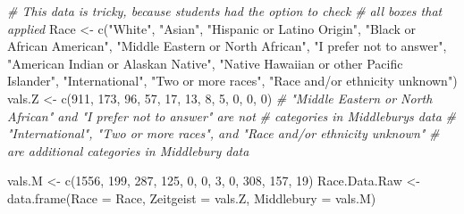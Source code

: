 \documentclass[
]{article}
\newenvironment{Shaded}{\begin{snugshade}}{\end{snugshade}}
\newcommand{\AttributeTok}[1]{\textcolor[rgb]{0.77,0.63,0.00}{#1}}
\newcommand{\CommentTok}[1]{\textcolor[rgb]{0.56,0.35,0.01}{\textit{#1}}}
\newcommand{\DecValTok}[1]{\textcolor[rgb]{0.00,0.00,0.81}{#1}}
\newcommand{\FunctionTok}[1]{\textcolor[rgb]{0.00,0.00,0.00}{#1}}
\newcommand{\NormalTok}[1]{#1}
\newcommand{\OtherTok}[1]{\textcolor[rgb]{0.56,0.35,0.01}{#1}}
\newcommand{\StringTok}[1]{\textcolor[rgb]{0.31,0.60,0.02}{#1}}
\begin{document}
\begin{Shaded}
\begin{Highlighting}[]
\CommentTok{\# This data is tricky, because students had the option to check}
\CommentTok{\# all boxes that applied}
\NormalTok{Race }\OtherTok{\textless{}{-}} \FunctionTok{c}\NormalTok{(}\StringTok{"White"}\NormalTok{, }\StringTok{"Asian"}\NormalTok{, }\StringTok{"Hispanic or Latino Origin"}\NormalTok{, }
          \StringTok{"Black or African American"}\NormalTok{, }\StringTok{"Middle Eastern or North African"}\NormalTok{, }
          \StringTok{"I prefer not to answer"}\NormalTok{, }\StringTok{"American Indian or Alaskan Native"}\NormalTok{,}
          \StringTok{"Native Hawaiian or other Pacific Islander"}\NormalTok{, }\StringTok{"International"}\NormalTok{, }
          \StringTok{"Two or more races"}\NormalTok{, }\StringTok{"Race and/or ethnicity unknown"}\NormalTok{)}
\NormalTok{vals.Z }\OtherTok{\textless{}{-}} \FunctionTok{c}\NormalTok{(}\DecValTok{911}\NormalTok{, }\DecValTok{173}\NormalTok{, }\DecValTok{96}\NormalTok{, }\DecValTok{57}\NormalTok{, }\DecValTok{17}\NormalTok{, }\DecValTok{13}\NormalTok{, }\DecValTok{8}\NormalTok{, }\DecValTok{5}\NormalTok{, }\DecValTok{0}\NormalTok{, }\DecValTok{0}\NormalTok{, }\DecValTok{0}\NormalTok{)}
\CommentTok{\# "Middle Eastern or North African" and "I prefer not to answer" are not }
\CommentTok{\# categories in Middlebury\textquotesingle{}s data}
\CommentTok{\# "International", "Two or more races", and "Race and/or ethnicity unknown" }
\CommentTok{\# are additional categories in Middlebury data}

\NormalTok{vals.M }\OtherTok{\textless{}{-}} \FunctionTok{c}\NormalTok{(}\DecValTok{1556}\NormalTok{, }\DecValTok{199}\NormalTok{, }\DecValTok{287}\NormalTok{, }\DecValTok{125}\NormalTok{, }\DecValTok{0}\NormalTok{, }\DecValTok{0}\NormalTok{, }\DecValTok{3}\NormalTok{, }\DecValTok{0}\NormalTok{, }\DecValTok{308}\NormalTok{, }\DecValTok{157}\NormalTok{, }\DecValTok{19}\NormalTok{)}
\NormalTok{Race.Data.Raw }\OtherTok{\textless{}{-}} \FunctionTok{data.frame}\NormalTok{(}\AttributeTok{Race =}\NormalTok{ Race,}
                        \AttributeTok{Zeitgeist =}\NormalTok{ vals.Z,}
                        \AttributeTok{Middlebury =}\NormalTok{ vals.M)}


\end{Highlighting}
\end{Shaded}
\end{document}
